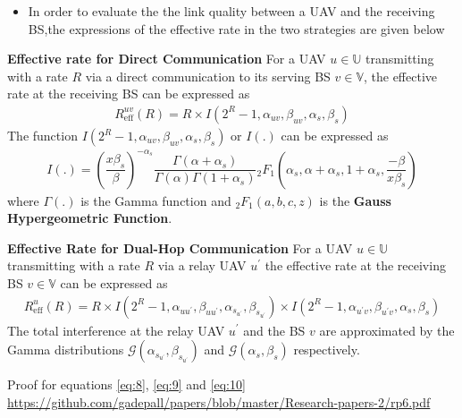 \documentclass{beamer}
\begin{document}
\begin{frame}{}
 \begin{itemize}
     \item In order to evaluate the the link quality between a UAV and the receiving BS,the expressions of the effective rate in the two strategies are given below
 \end{itemize}   
 \begin{block}{\textbf{Effective rate for Direct Communication}}
 For a UAV $u \in \mathbb{U}$ transmitting with a rate $R$ via a direct communication to its serving BS $v \in \mathbb{V}$, the effective rate at the receiving BS can be expressed as
 \begin{align}
 R^{uv}_{\text{eff}}(R) = R \times I(2^R-1,\alpha_{uv},\beta_{uv},\alpha_{s},\beta_{s})\label{eq:8}
 \end{align}
 The function $I(2^R-1,\alpha_{uv},\beta_{uv},\alpha_{s},\beta_{s})$ or $I(.)$ can be expressed as 
 \begin{align}
   I(.)= (\dfrac{x\beta_{s}}{\beta})^{-\alpha_{s}}\dfrac{\Gamma(\alpha+\alpha_{s})}{\Gamma(\alpha)\Gamma(1+\alpha_{s})}{}_{2}F_{1}(\alpha_{s},\alpha + \alpha_{s},1+\alpha_{s},\dfrac{-\beta}{x\beta_{s}})\label{eq:9}
 \end{align}
 where $\Gamma(.)$ is the Gamma function and ${}_{2}F_{1}(a,b,c,z)$ is the \textbf{Gauss Hypergeometric Function}.
 \end{block}
 
\end{frame}

\begin{frame}{}
\begin{block}{\textbf{Effective Rate for Dual-Hop Communication}}
 For a UAV $u \in \mathbb{U}$ transmitting with a rate $R$ via a relay UAV $u^\prime$  the effective rate at the receiving BS $v \in \mathbb{V}$ can be expressed as
 \begin{align}
 R^{u}_{\text{eff}}(R) = R \times I(2^R-1,\alpha_{uu^\prime},\beta_{uu^\prime},\alpha_{s_{u^\prime}},\beta_{s_{u^\prime}}) \times I(2^R-1,\alpha_{u^\prime v},\beta_{u^\prime v},\alpha_{s},\beta_{s})\label{eq:10}
 \end{align}
 The total interference at the relay UAV $u^\prime$ and the BS $v$ are approximated by the Gamma distributions $\mathscr{G}(\alpha_{s_{u^\prime}},\beta_{s_{u^\prime}})$ and $\mathscr{G}(\alpha_{s},\beta_{s})$ respectively.
\end{block}

 \begin{block}{Proof for equations \eqref{eq:8}, \eqref{eq:9} and \eqref{eq:10}}
 \url{https://github.com/gadepall/papers/blob/master/Research-papers-2/rp6.pdf}
 \end{block} 
\end{frame}
\end{document}
